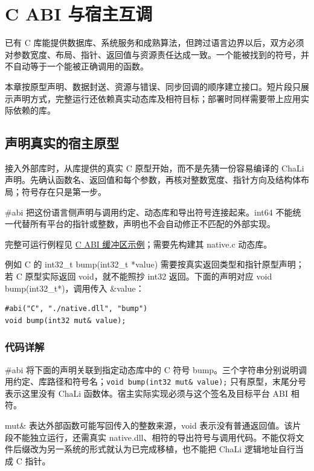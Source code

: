 \chapter{C ABI 与宿主互调}
\label{ch:21}

已有 C 库能提供数据库、系统服务和成熟算法，但跨过语言边界以后，双方必须对参数宽度、布局、指针、返回值与资源责任达成一致。一个能被找到的符号，并不自动等于一个能被正确调用的函数。

本章按原型声明、数据封送、资源与错误、同步回调的顺序建立接口。短片段只展示声明方式，完整运行还依赖真实动态库及相符目标；部署时同样需要带上应用实际依赖的库。

\section{声明真实的宿主原型}

接入外部库时，从库提供的真实 C 原型开始，而不是先猜一份容易编译的 ChaLi 声明。先确认函数名、返回值和每个参数，再核对整数宽度、指针方向及结构体布局；符号存在只是第一步。

\#abi 把这份语言侧声明与调用约定、动态库和导出符号连接起来。int64 不能统一代替所有平台的指针或整数，声明也不会自动修正不匹配的外部实现。

完整可运行例程见 \href{https://github.com/rabbitc999/ChaLi/blob/master/doc/examples/abi_buffers/demo.chl}{C ABI 缓冲区示例}；需要先构建其 native.c 动态库。

例如 C 的 int32\_t bump(int32\_t *value) 需要按真实返回类型和指针原型声明；若 C 原型实际返回 void，就不能照抄 int32 返回。下面的声明对应 void bump(int32\_t*)，调用传入 \&value：

\par
\medskip
\begin{lstlisting}[style=chali]
#abi("C", "./native.dll", "bump")
void bump(int32 mut& value);
\end{lstlisting}
\par
\medskip

\subsection*{代码详解}

\#abi 将下面的声明关联到指定动态库中的 C 符号 bump。三个字符串分别说明调用约定、库路径和符号名；\texttt{void bump(\allowbreak{}int32 mut\& value)\allowbreak{};} 只有原型，末尾分号表示这里没有 ChaLi 函数体。宿主实际实现必须与这个签名及目标平台 ABI 相符。

mut\& 表达外部函数可能写回传入的整数来源，void 表示没有普通返回值。该片段不能独立运行，还需真实 native.dll、相符的导出符号与调用代码。不能仅将文件后缀改为另一系统的形式就认为已完成移植，也不能把 ChaLi 逻辑地址自行当成 C 指针。

